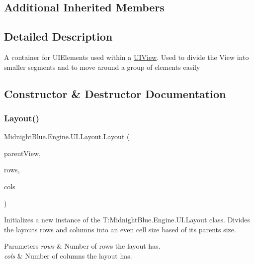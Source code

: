 \subsection*{Additional Inherited Members}


\subsection{Detailed Description}
A container for U\+I\+Elements used within a \hyperlink{class_midnight_blue_1_1_engine_1_1_u_i_1_1_u_i_view}{U\+I\+View}. Used to divide the View into smaller segments and to move around a group of elements easily 



\subsection{Constructor \& Destructor Documentation}
\hypertarget{class_midnight_blue_1_1_engine_1_1_u_i_1_1_layout_a37ad7b392b6ebab35c7bf2797b0f459a}{}\label{class_midnight_blue_1_1_engine_1_1_u_i_1_1_layout_a37ad7b392b6ebab35c7bf2797b0f459a} 
\subsubsection{\texorpdfstring{Layout()}{Layout()}}
{\footnotesize\ttfamily Midnight\+Blue.\+Engine.\+U\+I.\+Layout.\+Layout (\begin{DoxyParamCaption}\item[{\hyperlink{class_midnight_blue_1_1_engine_1_1_u_i_1_1_u_i_view}{U\+I\+View}}]{parent\+View,  }\item[{int}]{rows,  }\item[{int}]{cols }\end{DoxyParamCaption})\hspace{0.3cm}{\ttfamily [inline]}}



Initializes a new instance of the T\+:\+Midnight\+Blue.\+Engine.\+U\+I.\+Layout class. Divides the layouts rows and columns into an even cell size based of its parents size. 


\begin{DoxyParams}{Parameters}
{\em rows} & Number of rows the layout has.\\
\hline
{\em cols} & Number of columns the layout has.\\
\hline
\end{DoxyParams}


